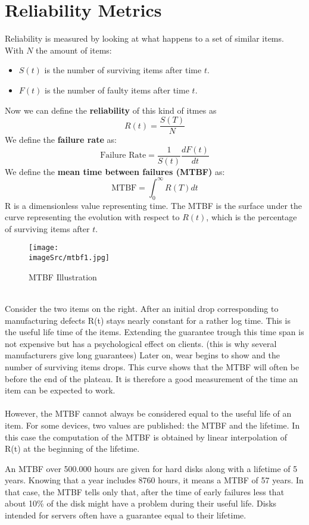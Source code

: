 \documentclass[../main.tex]{subfiles}
\renewcommand{\imageSrc}{../images/}
\begin{document}
\section{Reliability Metrics}
Reliability is measured by looking at what happens to a set of similar items. With $N$ the amount of items:
\begin{itemize}
	\item $S(t)$ is the number of surviving items after time $t$.
	\item $F(t)$ is the number of faulty items after time $t$.
\end{itemize}
Now we can define the \textbf{reliability} of this kind of itmes as 
\[
R(t) = \frac{S(T)}{N}
\]
We define the \textbf{failure rate} as:
\[
\text{Failure Rate} = \frac{1}{S(t)} \frac{dF(t)}{dt}
\]
We define the \textbf{mean time between failures (MTBF)} as:
\[
\text{MTBF} = \int_0^{\infty} R(T) dt
\]
R is a dimensionless value representing time. The MTBF is the surface under the curve representing the evolution with respect to $R(t)$, which is the percentage of surviving items after $t$.
\begin{figure}[h!]
    \centering
    \texttt{[image: \\imageSrc/mtbf1.jpg]}
    \caption{MTBF Illustration}
    \label{mtbf1}
\end{figure}
\\
Consider the two items on the right. After an initial drop corresponding to manufacturing defects R(t) stays nearly constant for a rather log time. This is the useful life time of the items. Extending the guarantee trough this time span is not expensive but has a psychological effect on clients. (this is why several manufacturers give long guarantees)
Later on, wear begins to show and the number of surviving items drops. This curve shows that the MTBF will often be before the end of the plateau. It is therefore a good measurement of the time an item can be expected to work.
\\\\
However, the MTBF cannot always be considered equal to the useful life of an item. For some devices, two values are published: the MTBF and the lifetime. In this case the computation of the MTBF is obtained by linear interpolation of R(t) at the beginning of the lifetime.

\begin{exmp}
An MTBF over 500.000 hours are given for hard disks along with a lifetime of 5 years. Knowing that a year includes 8760 hours, it means a MTBF of 57 years. In that case, the MTBF tells only that, after the time of early failures less that about 10\% of the disk might have a problem during their useful life. Disks intended for servers often have a guarantee equal to their lifetime.
\end{exmp}
\end{document}
